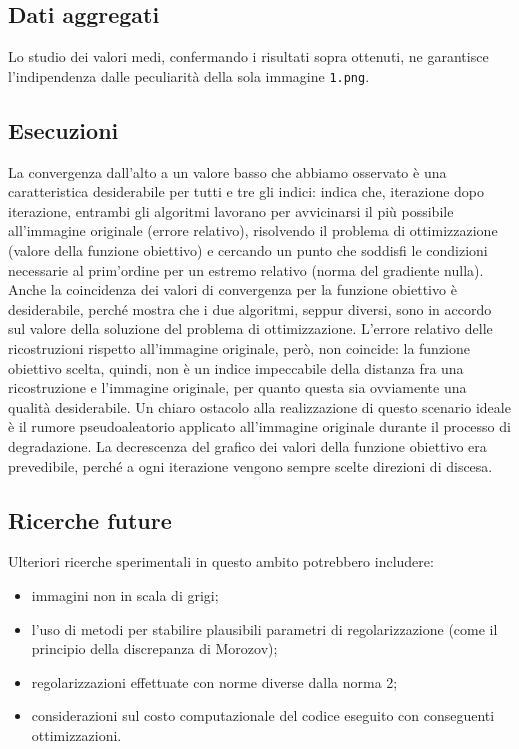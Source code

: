 \documentclass[a4paper]{article}
\begin{document}
\subsection{Dati aggregati}
Lo studio dei valori medi, confermando i risultati sopra ottenuti, ne garantisce
l'indipendenza dalle peculiarità della sola immagine \verb!1.png!.

\subsection{Esecuzioni}
La convergenza dall'alto a un valore basso che abbiamo osservato è una
caratteristica desiderabile per tutti e tre gli indici: indica che, iterazione
dopo iterazione, entrambi gli algoritmi lavorano per avvicinarsi il più
possibile all'immagine originale (errore relativo), risolvendo il problema di
ottimizzazione (valore della funzione obiettivo) e cercando un punto che
soddisfi le condizioni necessarie al prim'ordine per un estremo relativo (norma
del gradiente nulla). Anche la coincidenza dei valori di convergenza per la
funzione obiettivo è desiderabile, perché mostra che i due algoritmi, seppur
diversi, sono in accordo sul valore della soluzione del problema di
ottimizzazione. L'errore relativo delle ricostruzioni rispetto all'immagine
originale, però, non coincide: la funzione obiettivo scelta, quindi, non è un
indice impeccabile della distanza fra una ricostruzione e l'immagine originale,
per quanto questa sia ovviamente una qualità desiderabile. Un chiaro ostacolo
alla realizzazione di questo scenario ideale è il rumore pseudoaleatorio
applicato all'immagine originale durante il processo di degradazione. La
decrescenza del grafico dei valori della funzione obiettivo era prevedibile,
perché a ogni iterazione vengono sempre scelte direzioni di discesa.

\subsection{Ricerche future}
Ulteriori ricerche sperimentali in questo ambito potrebbero includere:
\begin{itemize}
  \item immagini non in scala di grigi;
  \item l'uso di metodi per stabilire plausibili parametri di regolarizzazione
    (come il principio della discrepanza di Morozov);
  \item regolarizzazioni effettuate con norme diverse dalla norma 2;
  \item considerazioni sul costo computazionale del codice eseguito con
    conseguenti ottimizzazioni.
\end{itemize}
  
\end{document}
